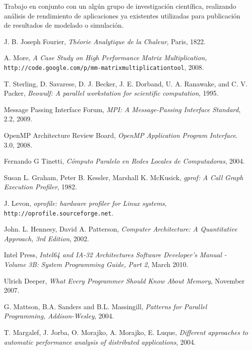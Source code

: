 \documentclass[a4paper]{report}
\begin{document}
\bigskip

Trabajo en conjunto con un alg\'un grupo de investigaci\'on cient\'ifica,
realizando an\'alisis de rendimiento de aplicaciones ya existentes utilizadas
para publicaci\'on de resultados de modelado o simulaci\'on.

\begin{thebibliography}{9}

  J. B. Joseph Fourier, \emph{Th\'eorie Analytique de la Chaleur}, Paris, 1822.

  A. More,
  \emph{A Case Study on High Performance Matrix Multiplication},
  {\tt http://code.google.com/p/mm-matrixmultiplicationtool},
  2008.

  T. Sterling, D. Savarese, D. J. Becker, J. E. Dorband, U. A. Ranawake,
  and C. V. Packer,
  \emph{Beowulf: A parallel workstation for scientific computation},
  1995.

  Message Passing Interface Forum,
  \emph{MPI: A Message-Passing Interface Standard},
  2.2,
  2009.

  OpenMP Architecture Review Board,
  \emph{OpenMP Application Program Interface}.
  3.0,
  2008.

  Fernando G Tinetti,
  \emph{C\'omputo Paralelo en Redes Locales de Computadoras},
  2004.

  Susan L. Graham,  Peter B. Kessler,  Marshall K. McKusick,
  \emph{gprof: A Call Graph Execution Profiler},
  1982.
  
  J. Levon,
  \emph{oprofile: hardware profiler for Linux systems},
       {\tt http://oprofile.sourceforge.net}.
  
  John. L. Hennesy, David A. Patterson,
  \emph{Computer Architecture: A Quantitative Approach, 3rd Edition},
  2002.

  Intel Press,
  \emph{Intel64 and IA-32 Architectures Software Developer's Manual - Volume
    3B: System Programming Guide, Part 2},
  March 2010.

  Ulrich Deeper,
  \emph{What Every Programmer Should Know About Memory},
  November 2007.

  G. Mattson, B.A. Sanders and B.L. Massingill, 
  \emph{Patterns for Parallel Programming, Addison-Wesley},
  2004.
  
  T. Margalef, J. Jorba, O. Morajko, A. Morajko, E. Luque,
  \emph{Different approaches to automatic performance analysis of distributed
    applications},
  2004.
  

\end{thebibliography}
\end{document}
